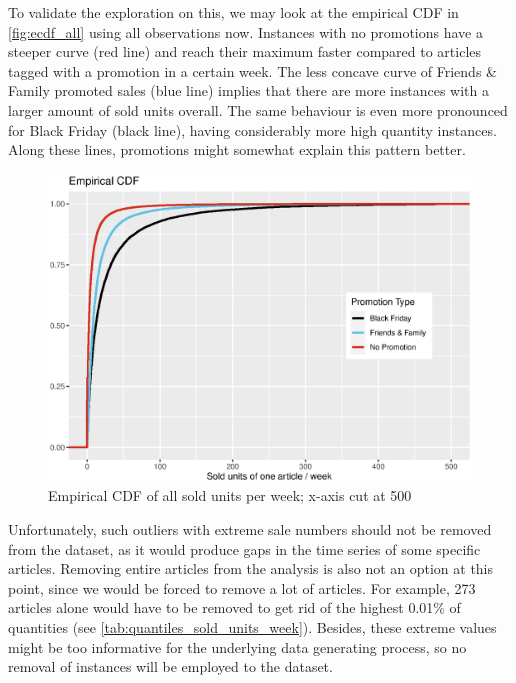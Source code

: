 To validate the exploration on this, we may look at the empirical \ac{CDF} in \autoref{fig:ecdf_all} using all observations now.
Instances with no promotions have a steeper curve (red line) and reach their maximum faster compared to articles tagged with a promotion in a certain week. The less concave curve of Friends \& Family promoted sales (blue line) implies that there are more instances with a larger amount of sold units overall. The same behaviour is even more pronounced for Black Friday (black line), having considerably more high quantity instances. Along these lines, promotions might somewhat explain this pattern better.\\
 
 
 \begin{figure}[H]
\centering
  \includegraphics[width=0.65\linewidth]{figures/ecdf_all.eps}
  \caption{Empirical \ac{CDF} of all sold units per week; x-axis cut at 500}
  \label{fig:ecdf_all}
\end{figure}



Unfortunately, such outliers with extreme sale numbers should not be removed from the dataset, as it would produce gaps in the time series of some specific articles. Removing entire articles from the analysis is also not an option at this point, since we would be forced to remove a lot of articles.
For example, 273 articles alone would have to be removed to get rid of the highest 0.01\% of quantities (see \autoref{tab:quantiles_sold_units_week}). Besides, these extreme values might be too informative for the underlying data generating process, so no removal of instances will be employed to the dataset.









